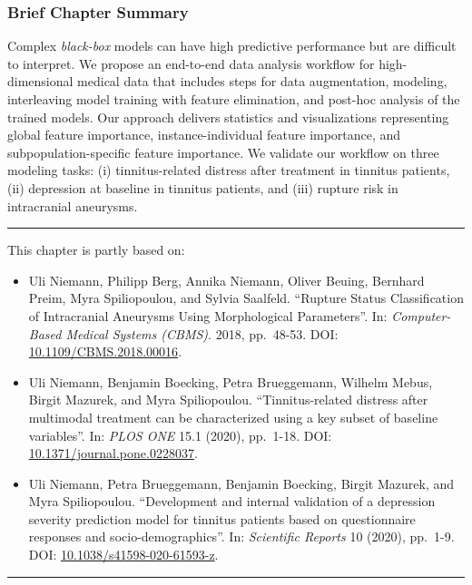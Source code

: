 \documentclass[
  oneside]{book}
\providecommand{\tightlist}{%
  \setlength{\itemsep}{0pt}\setlength{\parskip}{0pt}}
\newenvironment{infobox}[1]
  {
  \begin{chapter-summary}
  }
  {
  \end{chapter-summary}
  }
\newenvironment{lit}
  {
  \vspace{8pt}
  \hrule
  \vspace{8pt}
  }
  {
  \vspace{8pt}
  \hrule
  \vspace{8pt}
  }
\begin{document}
\begin{infobox}{tasks.pdf}

\hypertarget{brief-chapter-summary-5}{%
\subsubsection*{Brief Chapter Summary}\label{brief-chapter-summary-5}}

Complex \emph{black-box} models can have high predictive performance but are difficult to interpret.
We propose an end-to-end data analysis workflow for high-dimensional medical data that includes steps for data augmentation, modeling, interleaving model training with feature elimination, and post-hoc analysis of the trained models.
Our approach delivers statistics and visualizations representing global feature importance, instance-individual feature importance, and subpopulation-specific feature importance.
We validate our workflow on three modeling tasks: (i) tinnitus-related distress after treatment in tinnitus patients, (ii) depression at baseline in tinnitus patients, and (iii) rupture risk in intracranial aneurysms.

\end{infobox}

\begin{lit}

This chapter is partly based on:

\begin{itemize}
\tightlist
\item
  Uli Niemann, Philipp Berg, Annika Niemann, Oliver Beuing, Bernhard Preim, Myra Spiliopoulou, and Sylvia Saalfeld. ``Rupture Status Classification of Intracranial Aneurysms Using Morphological Parameters''. In: \emph{Computer-Based Medical Systems (CBMS)}. 2018, pp.~48-53. DOI: \href{https://doi.org/10.1109\%2FCBMS.2018.00016}{10.1109/CBMS.2018.00016}.
\item
  Uli Niemann, Benjamin Boecking, Petra Brueggemann, Wilhelm Mebus, Birgit Mazurek, and Myra Spiliopoulou. ``Tinnitus-related distress after multimodal treatment can be characterized using a key subset of baseline variables''. In: \emph{PLOS ONE} 15.1 (2020), pp.~1-18. DOI: \href{https://doi.org/10.1371\%2Fjournal.pone.0228037}{10.1371/journal.pone.0228037}.
\item
  Uli Niemann, Petra Brueggemann, Benjamin Boecking, Birgit Mazurek, and Myra Spiliopoulou. ``Development and internal validation of a depression severity prediction model for tinnitus patients based on questionnaire responses and socio-demographics''. In: \emph{Scientific Reports} 10 (2020), pp.~1-9. DOI: \href{https://doi.org/10.1038\%2Fs41598-020-61593-z}{10.1038/s41598-020-61593-z}.
\end{itemize}

\end{lit}
\end{document}

